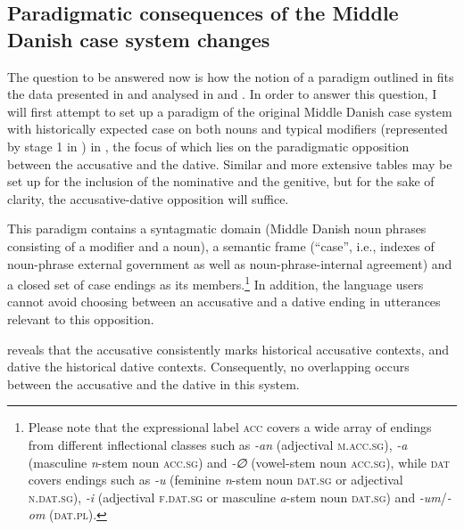 \documentclass[output=paper]{langsci/langscibook}
\begin{document}
\subsection{Paradigmatic consequences of the Middle Danish case system changes} \label{hansen:4.2}\largerpage

The question to be answered now is how the notion of a paradigm outlined in  fits the data presented in  and analysed in  and . In order to answer this question, I will first attempt to set up a paradigm of the original Middle Danish case system with historically expected case on both nouns and typical modifiers (represented by stage 1 in ) in , the focus of which lies on the paradigmatic opposition between the accusative and the dative. Similar and more extensive tables may be set up for the inclusion of the nominative and the genitive, but for the sake of clarity, the accusative-dative opposition will suffice.

This paradigm contains a syntagmatic domain (Middle Danish noun phrases consisting of a modifier and a noun), a semantic frame (“case”, i.e., indexes of noun-phrase external government as well as noun-phrase-internal agreement) and a closed set of case endings as its members.\footnote{Please note that the expressional label \textsc{acc} covers a wide array of endings from different inflectional classes such as \textit{{}-an} (adjectival \textsc{m.acc.sg}), \textit{{}-a} (masculine \textit{n}{}-stem noun \textsc{acc.sg}) and \textit{{}-∅} (vowel-stem noun \textsc{acc.sg}), while \textsc{dat} covers endings such as \textit{{}-u} (feminine \textit{n}{}-stem noun \textsc{dat.sg} or adjectival \textsc{n.dat.sg}), \textit{{}-i} (adjectival \textsc{f.dat.sg} or masculine \textit{a}{}-stem noun \textsc{dat.sg}) and \textit{{}-um}/\textit{{}-om} (\textsc{dat.pl}).} In addition, the language users cannot avoid choosing between an accusative and a dative ending in utterances relevant to this opposition.

 reveals that the accusative consistently marks historical accusative contexts, and dative the historical dative contexts. Consequently, no overlapping occurs between the accusative and the dative in this system.
\end{document}
